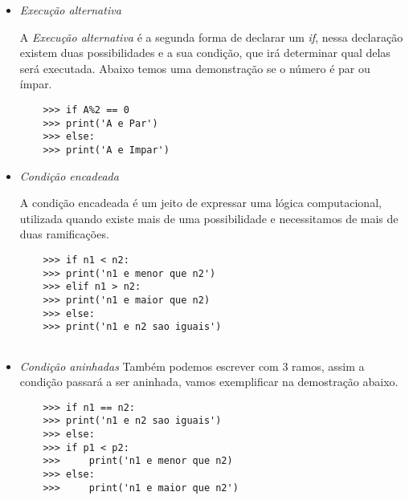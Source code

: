 			 \begin{itemize}
			 	\item \textit{Execução alternativa}
			 	
			 	 A \textit{Execução alternativa} é a segunda forma de declarar um \textit{if}, nessa declaração existem duas possibilidades e a sua condição, que irá determinar qual delas será executada. Abaixo temos uma demonstração se o número é par ou ímpar.
			 	 \begin{lstlisting}
	>>> if A%2 == 0
	>>>	print('A e Par')
	>>> else:
	>>>	print('A e Impar')

			 	 \end{lstlisting}
				\item \textit{Condição encadeada}
				
				A condição encadeada é um jeito de expressar uma lógica computacional, utilizada quando existe mais de uma possibilidade e necessitamos de mais de duas ramificações. 
				
				\begin{lstlisting}
	>>> if n1 < n2:
	>>>	print('n1 e menor que n2')
	>>> elif n1 > n2:
	>>>	print('n1 e maior que n2)
	>>> else:
	>>>	print('n1 e n2 sao iguais')
					
				\end{lstlisting}
			
				\item \textit{Condição aninhadas}
				Também podemos escrever com 3 ramos, assim a condição passará a ser aninhada, vamos exemplificar na demostração abaixo.
					\begin{lstlisting}
	>>> if n1 == n2:
	>>>	print('n1 e n2 sao iguais')
	>>> else:
	>>>	if p1 < p2:	
	>>>	    print('n1 e menor que n2)
	>>>	else:
	>>>	    print('n1 e maior que n2')
					
				\end{lstlisting}
			 \end{itemize}
			  

